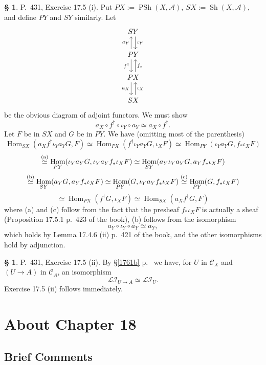 \documentclass[12pt]{article}%
\theoremstyle{remark}
\theoremstyle{definition}
\newtheorem{s}[thm]{\S}%
\newcommand{\cc}{\mathcal}
\newcommand{\oo}{\operatorname}
\newcommand{\A}{\mathcal A}
\newcommand{\C}{\mathcal C}
\DeclareMathOperator{\Hom}{Hom}%
\begin{document}
\begin{s}\label{175i}
P.~431, Exercise 17.5 (i). Put $PX:=\oo{PSh}(X,\A),\ SX:=\oo{Sh}(X,\A)$, and define $PY$ and $SY$ similarly. Let
$$
\begin{tikzcd} 
SY\ar[xshift=0.7ex]{d}{\iota_Y}\\ 
PY\ar[xshift=-0.7ex]{u}{a_Y}\ar[xshift=-0.7ex]{d}[swap]{f^\dagger}\\ 
PX\ar[xshift=0.7ex]{u}[swap]{f_*}\ar[xshift=-0.7ex]{d}[swap]{a_X}\\ 
SX\ar[xshift=0.7ex]{u}[swap]{\iota_X}
\end{tikzcd}
$$ 
be the obvious diagram of adjoint functors. We must show 
$$
a_X\circ f^\dagger\circ \iota_Y\circ a_Y\simeq a_X\circ f^\dagger. 
$$ 
Let $F$ be in $SX$ and $G$ be in $PY$. We have (omitting most of the parenthesis) 
$$
\Hom_{SX}(a_Xf^\dagger\iota_Ya_YG,F)\simeq
\Hom_{PX}(f^\dagger\iota_Ya_YG,\iota_XF)\simeq
\Hom_{PY}(\iota_Ya_YG,f_*\iota_XF)
$$
$$
\overset{(\text a)}{\simeq}
\Hom_{PY}(\iota_Ya_YG,\iota_Ya_Yf_*\iota_XF)\simeq
\Hom_{SY}(a_Y\iota_Ya_YG,a_Yf_*\iota_XF)
$$
$$
\overset{(\text b)}{\simeq}
\Hom_{SY}(a_YG,a_Yf_*\iota_XF)\simeq
\Hom_{PY}(G,\iota_Ya_Yf_*\iota_XF)\overset{(\text c)}{\simeq}
\Hom_{PY}(G,f_*\iota_XF)
$$ 
$$ 
\simeq 
\Hom_{PX}(f^\dagger G,\iota_XF)\simeq 
\Hom_{SX}(a_Xf^\dagger G,F)
$$ 
where (a) and (c) follow from the fact that the presheaf $f_*\iota_XF$ is actually a sheaf (Proposition 17.5.1 p.~423 of the book), (b) follows from the isomorphism 
$$
a_Y\circ \iota_Y\circ a_Y\simeq a_Y,
$$ 
which holds by Lemma 17.4.6 (ii) p.~421 of the book, and the other isomorphisms hold by adjunction. 
\end{s} 

%

\begin{s} 
P.~431, Exercise 17.5 (ii). By \S\ref{1761b} p.~\pageref{1761b} we have, for $U$ in $\C_X$ and $(U\to A)$ in $\C_A$, an isomorphism 
$$
\cc{LI}_{U\to A}\simeq\cc{LI}_U.
$$
Exercise 17.5 (ii) follows immediately. 
\end{s} 


\section{About Chapter 18} 

\subsection{Brief Comments}
\end{document}
